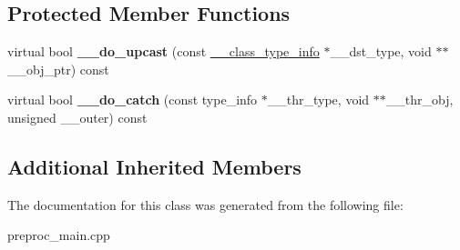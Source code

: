 \subsection*{Protected Member Functions}
\begin{DoxyCompactItemize}
\item 
\hypertarget{class____cxxabiv1_1_1____class__type__info_a68a8e0ced69ad37ffd02994f028d7da2}{virtual bool {\bfseries \+\_\+\+\_\+do\+\_\+upcast} (const \hyperlink{class____cxxabiv1_1_1____class__type__info}{\+\_\+\+\_\+class\+\_\+type\+\_\+info} $\ast$\+\_\+\+\_\+dst\+\_\+type, void $\ast$$\ast$\+\_\+\+\_\+obj\+\_\+ptr) const }\label{class____cxxabiv1_1_1____class__type__info_a68a8e0ced69ad37ffd02994f028d7da2}

\item 
\hypertarget{class____cxxabiv1_1_1____class__type__info_a5cc0730f50e7c6144dda6db1d67634d5}{virtual bool {\bfseries \+\_\+\+\_\+do\+\_\+catch} (const type\+\_\+info $\ast$\+\_\+\+\_\+thr\+\_\+type, void $\ast$$\ast$\+\_\+\+\_\+thr\+\_\+obj, unsigned \+\_\+\+\_\+outer) const }\label{class____cxxabiv1_1_1____class__type__info_a5cc0730f50e7c6144dda6db1d67634d5}

\end{DoxyCompactItemize}
\subsection*{Additional Inherited Members}


The documentation for this class was generated from the following file\+:\begin{DoxyCompactItemize}
\item 
preproc\+\_\+main.\+cpp\end{DoxyCompactItemize}
